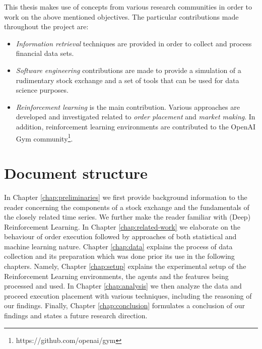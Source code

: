 This thesis makes use of concepts from various research communities in order to work on the above mentioned objectives.
The particular contributions made throughout the project are:
\begin{itemize}
    \item \textit{Information retrieval} techniques are provided in order to collect and process financial data sets.
    \item \textit{Software engineering} contributions are made to provide a simulation of a rudimentary stock exchange and a set of tools that can be used for data science purposes.
    \item \textit{Reinforcement learning} is the main contribution. 
    Various approaches are developed and investigated related to \textit{order placement} and \textit{market making}.
    In addition, reinforcement learning environments are contributed to the OpenAI Gym community\footnote{https://github.com/openai/gym}.
\end{itemize}


\section{Document structure}

In Chapter \ref{chap:preliminaries} we first provide background information to the reader concerning the components of a stock exchange and the fundamentals of the closely related time series.
We further make the reader familiar with (Deep) Reinforcement Learning.
In Chapter \ref{chap:related-work} we elaborate on the behaviour of order execution followed by approaches of both statistical and machine learning nature.
Chapter \ref{chap:data} explains the process of data collection and its preparation which was done prior its use in the following chapters.
Namely, Chapter \ref{chap:setup} explains the experimental setup of the Reinforcement Learning environments, the agents and the features being processed and used.
In Chapter \ref{chap:analysis} we then analyze the data and proceed execution placement with various techniques, including the reasoning of our findings.
Finally, Chapter \ref{chap:conclusion} formulates a conclusion of our findings and states a future research direction.
